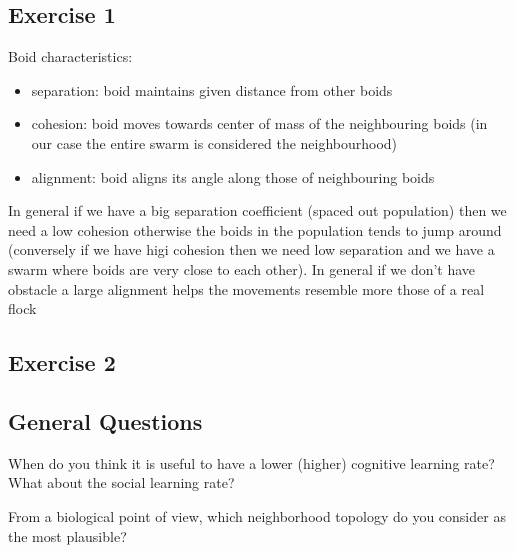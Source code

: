\subsection{Exercise 1}
Boid characteristics:
\begin{itemize}
    \item separation: boid maintains given distance from other boids
    \item cohesion: boid moves towards center of mass of the neighbouring boids (in our case the entire swarm is considered the neighbourhood)
    \item alignment: boid aligns its angle along those of neighbouring boids 
\end{itemize}

In general if we have a big separation coefficient (spaced out population) then we need a low cohesion otherwise the boids in the population tends to jump around (conversely if we have higi cohesion then we need low separation and we have a swarm where boids are very close to each other). In general if we don't have obstacle a large alignment helps the movements resemble more those of a real flock

\subsection{Exercise 2}

\subsection{General Questions}
When do you think it is useful to have a lower (higher) cognitive learning rate? What about the social learning rate?

From a biological point of view, which neighborhood topology do you consider as the most plausible?
